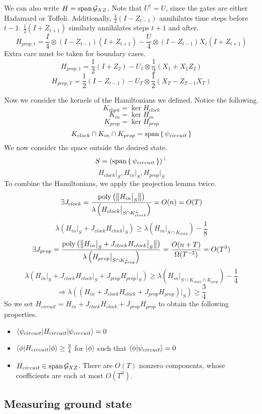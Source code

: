 We can also write $H=\operatorname*{\operatorname{span}}\mathcal{G}_{XZ}$. Note that $U^\dagger=U$, since the gates are either Hadamard or Toffoli. Additionally, $\frac{1}{2}(I-Z_{t-1})$ annihilates time steps before $t-1$. $\frac{1}{2}(I+Z_{t+1})$ similarly annihilates steps $t+1$ and after.
$$H_{prop,t}=\frac{I}{4}\otimes(I-Z_{t-1})(I+Z_{t+1})-\frac{U}{4}\otimes(I-Z_{t-1})X_t(I+Z_{t+1})$$
Extra care must be taken for boundary cases.
$$H_{prop,1}=\frac{1}{2}(I+Z_2)-U_1\otimes\frac{1}{2}(X_1+X_1Z_2)$$
$$H_{prop,T}=\frac{1}{2}(I-Z_{t-1})-U_T\otimes\frac{1}{2}(X_T-Z_{T-1}X_T)$$

Now we consider the kernels of the Hamiltonians we defined. Notice the following.
$$K_{clock}=\ker H_{clock}$$
$$K_{in}=\ker H_{in}$$
$$K_{prop}=\ker H_{prop}$$
$$K_{clock}\cap K_{in}\cap K_{prop}=\operatorname*{\operatorname{span}}\set{\psi_{circuit}}$$
We now consider the space outside the desired state.
$$S=(\operatorname*{\operatorname{span}}\set{\psi_{circuit}})^\bot$$
$$H_{clock}\big|_S,H_{in}\big|_S,H_{prop}\big|_S$$
To combine the Hamiltonians, we apply the projection lemma twice.
$$\exists J_{clock}
=\frac{\operatorname*{\operatorname{poly}}\left(\left\lVert H_{in}\big|_S\right\rVert\right)}{\lambda\left(H_{clock}\big|_{S\cap K^\bot_{clock}}\right)}
=O(n)=O(T)$$
$$\lambda(H_{in}\big|_S+J_{clock}H_{clock}\big|_S)\geq
\lambda(H_{in}\big|_{S\cap K_{clock}})-\frac{1}{8}$$
$$\exists J_{prop}=\frac{\operatorname*{\operatorname{poly}}\left(\left\lVert H_{in}\big|_S+J_{clock}H_{clock}\big|_S\right\rVert\right)}{\lambda\left(H_{prop}\big|_{S\cap K^\bot_{prop}}\right)}
=\frac{O(n+T)}{\Omega(T^{-2})}=O(T^3)$$
$$\lambda(H_{in}\big|_S+J_{clock}H_{clock}\big|_S+J_{prop}H_{prop}\big|_S)\geq
\lambda(H_{in}\big|_{S\cap K_{clock}\cap K_{prop}})-\frac{1}{4}$$
$$\Rightarrow\lambda((H_{in}+J_{clock}H_{clock}+J_{prop}H_{prop})\big|_S)\geq\frac{3}{4}$$
So we set $H_{circuit}=H_{in}+J_{clock}H_{clock}+J_{prop}H_{prop}$ to obtain the following properties.
\begin{itemize}
	\item $\braket{\psi_{circuit}|H_{circuit}|\psi_{circuit}}=0$
	\item $\braket{\phi|H_{circuit}|\phi}\geq\frac{3}{4}$ for $\ket\phi$ such that $\braket{\phi|\psi_{circuit}}=0$
	\item $H_{circuit}\in\operatorname*{\operatorname{span}}\mathcal{G}_{XZ}$. There are $O(T)$ nonzero components, whose coefficients are each at most $O(T^3)$.
\end{itemize}

\subsection{Measuring ground state}

